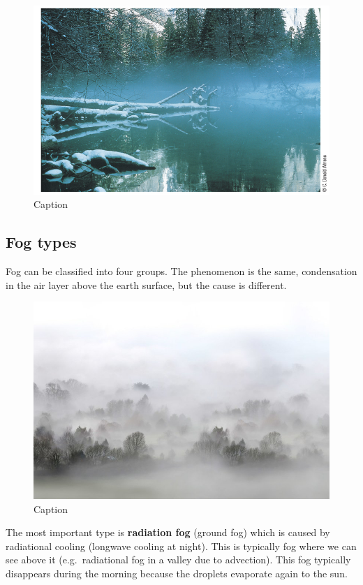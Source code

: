 \documentclass[12pt,oneside]{book}
\begin{document}
\begin{figure}

{\centering \includegraphics[width=0.8\linewidth]{figures/Figure240} 

}

\caption{Caption}\label{fig:Haze}
\end{figure}

\subsection{Fog types}\label{fog-types}

Fog can be classified into four groups. The phenomenon is the same,
condensation in the air layer above the earth surface, but the cause is
different.

\begin{figure}

{\centering \includegraphics[width=0.8\linewidth]{figures/Figure241} 

}

\caption{Caption}\label{fig:Fog}
\end{figure}

The most important type is \textbf{radiation fog} (ground fog) which is
caused by radiational cooling (longwave cooling at night). This is
typically fog where we can see above it (e.g.~radiational fog in a
valley due to advection). This fog typically disappears during the
morning because the droplets evaporate again to the sun.
\end{document}
